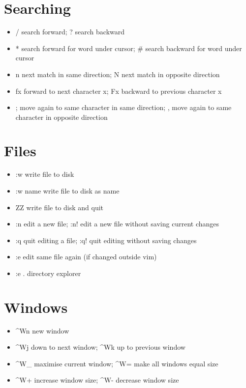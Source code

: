 \documentclass{article}
\begin{document}
\section{Searching}
\begin{itemize}

    \item / search forward; ? search backward
    \item * search forward for word under cursor; \# search backward for word under cursor
    \item n next match in same direction; N next match in opposite direction
    \item fx forward to next character x; Fx backward to previous character x
    \item ; move again to same character in same direction; , move again to same character in opposite direction
    \end{itemize}

\section{Files}
\begin{itemize}

    \item :w write file to disk
    \item :w name write file to disk as name
    \item ZZ write file to disk and quit
    \item :n edit a new file; :n! edit a new file without saving current changes
    \item :q quit editing a file; :q! quit editing without saving changes
    \item :e edit same file again (if changed outside vim)
    \item :e . directory explorer
    \end{itemize}

\section{Windows}
\begin{itemize}
    \item \textasciicircum Wn new window
    \item \textasciicircum Wj down to next window; \textasciicircum Wk up to previous window
    \item \textasciicircum W\_ maximise current window; \textasciicircum W= make all windows equal size
    \item \textasciicircum W+ increase window size; \textasciicircum W- decrease window size
    \end{itemize}
\end{document}
